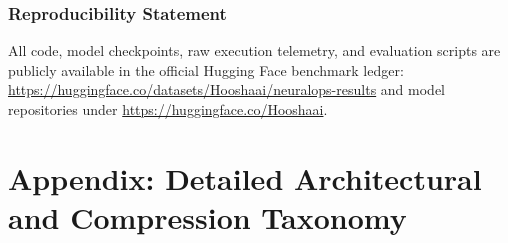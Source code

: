 \documentclass{article}
\begin{document}
\subsubsection*{Reproducibility Statement}
All code, model checkpoints, raw execution telemetry, and evaluation scripts are publicly available in the official Hugging Face benchmark ledger: \url{https://huggingface.co/datasets/Hooshaai/neuralops-results} and model repositories under \url{https://huggingface.co/Hooshaai}.




\newpage
\appendix
\section{Appendix: Detailed Architectural and Compression Taxonomy}
\label{sec:appendix_taxonomy}
\end{document}
